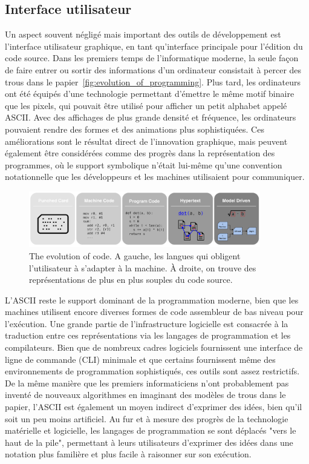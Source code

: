 {\subsection{Interface utilisateur}

Un aspect souvent négligé mais important des outils de développement est l'interface utilisateur graphique, en tant qu'interface principale pour l'édition du code source. Dans les premiers temps de l'informatique moderne, la seule façon de faire entrer ou sortir des informations d'un ordinateur consistait à percer des trous dans le papier~\autoref{fig:evolution_of_programming}. Plus tard, les ordinateurs ont été équipés d'une technologie permettant d'émettre le même motif binaire que les pixels, qui pouvait être utilisé pour afficher un petit alphabet appelé ASCII. Avec des affichages de plus grande densité et fréquence, les ordinateurs pouvaient rendre des formes et des animations plus sophistiquées. Ces améliorations sont le résultat direct de l'innovation graphique, mais peuvent également être considérées comme des progrès dans la représentation des programmes, où le support symbolique n'était lui-même qu'une convention notationnelle que les développeurs et les machines utilisaient pour communiquer.

\begin{figure}
\center
\includegraphics[width=0.90\textwidth]{../figures/progress_in_program.png}
\caption{The evolution of code. A gauche, les langues qui obligent l'utilisateur à s'adapter à la machine. À droite, on trouve des représentations de plus en plus souples du code source.}
\label{fig:evolution_of_programming}
\end{figure}

L'ASCII reste le support dominant de la programmation moderne, bien que les machines utilisent encore diverses formes de code assembleur de bas niveau pour l'exécution. Une grande partie de l'infrastructure logicielle est consacrée à la traduction entre ces représentations via les langages de programmation et les compilateurs. Bien que de nombreux cadres logiciels fournissent une interface de ligne de commande (CLI) minimale et que certains fournissent même des environnements de programmation sophistiqués, ces outils sont assez restrictifs. De la même manière que les premiers informaticiens n'ont probablement pas inventé de nouveaux algorithmes en imaginant des modèles de trous dans le papier, l'ASCII est également un moyen indirect d'exprimer des idées, bien qu'il soit un peu moins artificiel. Au fur et à mesure des progrès de la technologie matérielle et logicielle, les langages de programmation se sont déplacés "vers le haut de la pile", permettant à leurs utilisateurs d'exprimer des idées dans une notation plus familière et plus facile à raisonner sur son exécution.

}
